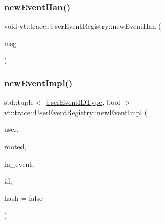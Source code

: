 \mbox{\label{structvt_1_1trace_1_1_user_event_registry_a314bba11008b65bce09a560d3107a5c5}} 
\subsubsection{\texorpdfstring{new\+Event\+Han()}{newEventHan()}}
{\footnotesize\ttfamily void vt\+::trace\+::\+User\+Event\+Registry\+::new\+Event\+Han (\begin{DoxyParamCaption}\item[{\hyperlink{structvt_1_1trace_1_1_user_event_registry_1_1_new_user_event_msg}{New\+User\+Event\+Msg} $\ast$}]{msg }\end{DoxyParamCaption})\hspace{0.3cm}{\ttfamily [static]}}

\mbox{\label{structvt_1_1trace_1_1_user_event_registry_ae3e2193c40fd3ff7de9367a02f9e457d}} 
\subsubsection{\texorpdfstring{new\+Event\+Impl()}{newEventImpl()}}
{\footnotesize\ttfamily std\+::tuple$<$ \hyperlink{namespacevt_1_1trace_a5908920d051c144c89f17c69ed262350}{User\+Event\+I\+D\+Type}, bool $>$ vt\+::trace\+::\+User\+Event\+Registry\+::new\+Event\+Impl (\begin{DoxyParamCaption}\item[{bool}]{user,  }\item[{bool}]{rooted,  }\item[{std\+::string const \&}]{in\+\_\+event,  }\item[{\hyperlink{namespacevt_1_1trace_a70c43e0e1596eea236912d4197d3120a}{User\+Spec\+Event\+I\+D\+Type}}]{id,  }\item[{bool}]{hash = {\ttfamily false} }\end{DoxyParamCaption})\hspace{0.3cm}{\ttfamily [private]}}

